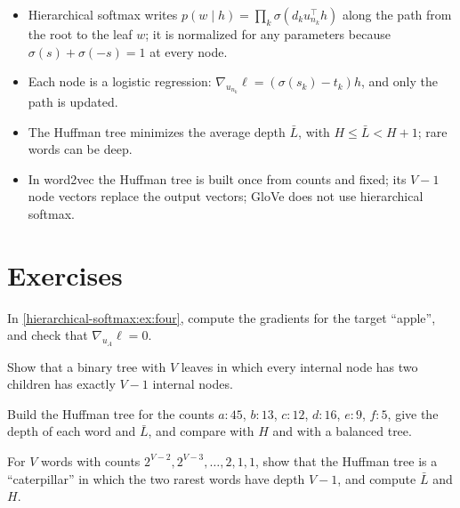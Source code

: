 \begin{notechapter}
\begin{chaptersummary}
\begin{itemize}
  \item Hierarchical softmax writes $p(w\mid h) = \prod_k\sigma(d_ku_{n_k}^\top h)$ along the path from the root to the leaf $w$; it is
        normalized for any parameters because $\sigma(s) + \sigma(-s) = 1$ at every node.
  \item Each node is a logistic regression: $\nabla_{u_{n_k}}\ell = (\sigma(s_k) - t_k)h$, and only the path is updated.
  \item The Huffman tree minimizes the average depth $\bar L$, with $H\leq\bar L < H + 1$; rare words can be deep.
  \item In word2vec the Huffman tree is built once from counts and fixed; its $V - 1$ node vectors replace
        the output vectors; GloVe does not use hierarchical softmax.
\end{itemize}
\end{chaptersummary}

\section*{Exercises}

\begin{exercise}\label{hierarchical-softmax:exr:1}
In \cref{hierarchical-softmax:ex:four}, compute the gradients for the target ``apple'', and check that
$\nabla_{u_A}\ell = 0$.
\end{exercise}

\begin{exercise}\label{hierarchical-softmax:exr:2}
Show that a binary tree with $V$ leaves in which every internal node has two children has exactly $V - 1$
internal nodes.
\end{exercise}

\begin{exercise}\label{hierarchical-softmax:exr:3}
Build the Huffman tree for the counts $a: 45$, $b: 13$, $c: 12$, $d: 16$, $e: 9$, $f: 5$, give the depth of each word and $\bar L$, and
compare with $H$ and with a balanced tree.
\end{exercise}

\begin{exercise}\label{hierarchical-softmax:exr:4}
For $V$ words with counts $2^{V-2}, 2^{V-3},\dots,2, 1, 1$, show that the Huffman tree is a ``caterpillar'' in which the two
rarest words have depth $V - 1$, and compute $\bar L$ and $H$.
\end{exercise}
\end{notechapter}
